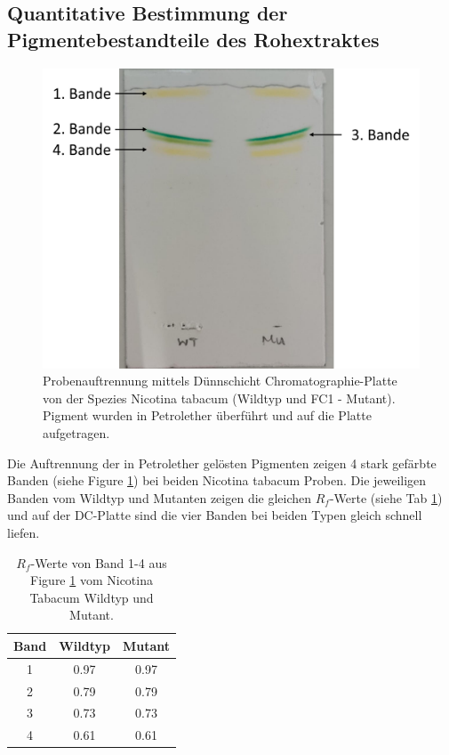 \documentclass[10pt,a4paper]{article}
\begin{document}
		\subsection{Quantitative Bestimmung der Pigmentebestandteile des Rohextraktes}
			
			\begin{figure}[H]
				\centering
				\includegraphics[scale=0.65]{DC-Plate_with_label.png}
				\caption{Probenauftrennung mittels Dünnschicht Chromatographie-Platte von der Spezies Nicotina tabacum (Wildtyp und FC1 - Mutant). Pigment wurden in Petrolether überführt und auf die Platte aufgetragen.}
				\label{fig:DC_Platte}
			\end{figure}
		
		Die Auftrennung der in Petrolether gelösten Pigmenten zeigen 4 stark gefärbte Banden (siehe Figure \ref{fig:DC_Platte}) bei beiden Nicotina tabacum Proben. Die jeweiligen Banden vom Wildtyp und Mutanten zeigen die gleichen $R_f$-Werte (siehe Tab \ref{tab:Rf_wert}) und auf der DC-Platte sind die vier Banden bei beiden Typen gleich schnell liefen.
		
			\begin{table}[H]
				\centering
				\caption{$R_f$-Werte von Band 1-4 aus Figure \ref{fig:DC_Platte} vom Nicotina Tabacum Wildtyp und Mutant.}
				\label{tab:Rf_wert}
				\begin{tabular}{ccc}
					\toprule
					Band&Wildtyp& Mutant\\
					\midrule
					1& 0.97 & 0.97\\
					2 & 0.79 & 0.79\\
					3 & 0.73 & 0.73 \\
					4 & 0.61 & 0.61\\
					\bottomrule
				\end{tabular}
			\end{table}	
			
\end{document}
